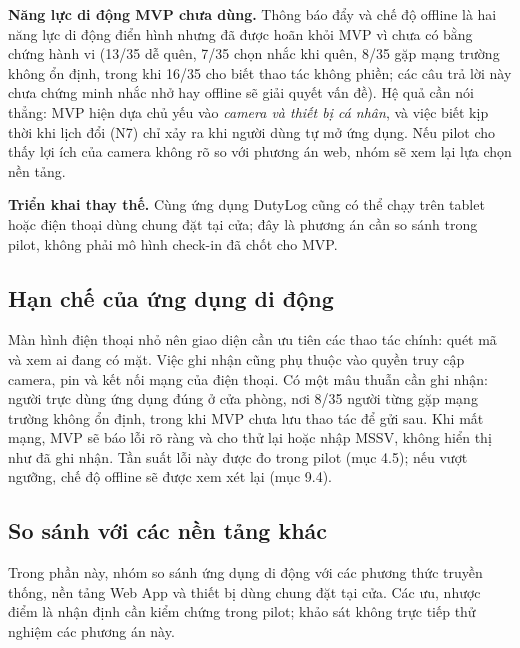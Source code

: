 \textbf{Năng lực di động MVP chưa dùng.} Thông báo đẩy và chế độ offline là hai năng lực di động điển hình nhưng đã được hoãn khỏi MVP vì chưa có bằng chứng hành vi (13/35 dễ quên, 7/35 chọn nhắc khi quên, 8/35 gặp mạng trường không ổn định, trong khi 16/35 cho biết thao tác không phiền; các câu trả lời này chưa chứng minh nhắc nhở hay offline sẽ giải quyết vấn đề). Hệ quả cần nói thẳng: MVP hiện dựa chủ yếu vào \emph{camera và thiết bị cá nhân}, và việc biết kịp thời khi lịch đổi (N7) chỉ xảy ra khi người dùng tự mở ứng dụng. Nếu pilot cho thấy lợi ích của camera không rõ so với phương án web, nhóm sẽ xem lại lựa chọn nền tảng.

\textbf{Triển khai thay thế.} Cùng ứng dụng DutyLog cũng có thể chạy trên tablet hoặc điện thoại dùng chung đặt tại cửa; đây là phương án cần so sánh trong pilot, không phải mô hình check-in đã chốt cho MVP.
\subsection{Hạn chế của ứng dụng di động}
Màn hình điện thoại nhỏ nên giao diện cần ưu tiên các thao tác chính: quét mã và xem ai đang có mặt. Việc ghi nhận cũng phụ thuộc vào quyền truy cập camera, pin và kết nối mạng của điện thoại. Có một mâu thuẫn cần ghi nhận: người trực dùng ứng dụng đúng ở cửa phòng, nơi 8/35 người từng gặp mạng trường không ổn định, trong khi MVP chưa lưu thao tác để gửi sau. Khi mất mạng, MVP sẽ báo lỗi rõ ràng và cho thử lại hoặc nhập MSSV, không hiển thị như đã ghi nhận. Tần suất lỗi này được đo trong pilot (mục 4.5); nếu vượt ngưỡng, chế độ offline sẽ được xem xét lại (mục 9.4).
\subsection{So sánh với các nền tảng khác}

Trong phần này, nhóm so sánh ứng dụng di động với các phương thức truyền thống, nền tảng Web App và thiết bị dùng chung đặt tại cửa. Các ưu, nhược điểm là nhận định cần kiểm chứng trong pilot; khảo sát không trực tiếp thử nghiệm các phương án này.

